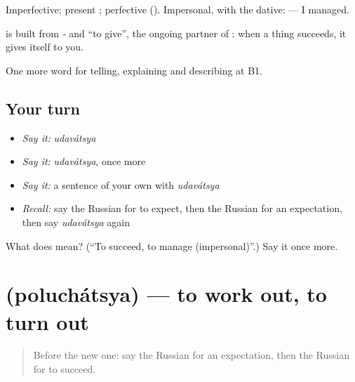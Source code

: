 Imperfective; present \emph{}; perfective \emph{} (\emph{}). Impersonal, with the dative: \emph{ } — I managed.

\begin{cousinweb}
\textbf{} is built from \emph{-} and \emph{} \textquotedblleft{}to give\textquotedblright{}, the ongoing partner of \emph{}: when a thing succeeds, it gives itself to you.
\end{cousinweb}

\begin{grammarlens}[title={What you've built}]
One more word for telling, explaining and describing at B1.
\end{grammarlens}

\subsection*{Your turn}
\begin{itemize}
\raggedright
  \item \emph{Say it:} \emph{udavátsya}
  \item \emph{Say it:} \emph{udavátsya}, once more
  \item \emph{Say it:} a sentence of your own with \emph{udavátsya}
  \item \emph{Recall:} say the Russian for to expect, then the Russian for an expectation, then say \emph{udavátsya} again
\end{itemize}

\begin{tcolorbox}[breakable,colback=teal!4,colframe=teal!35!black,title={Before you move on}]
What does  mean? (\textquotedblleft{}To succeed, to manage (impersonal)\textquotedblright{}.) Say it once more.
\end{tcolorbox}
\section[\texorpdfstring{\ru{получаться} (poluchátsya)}{получаться (poluchátsya)}]{ (poluchátsya) — to work out, to turn out}

\label{lesson:RU-C374-poluchatsya}



\begin{quote}
Before the new one: say the Russian for an expectation, then the Russian for to succeed.
\end{quote}

